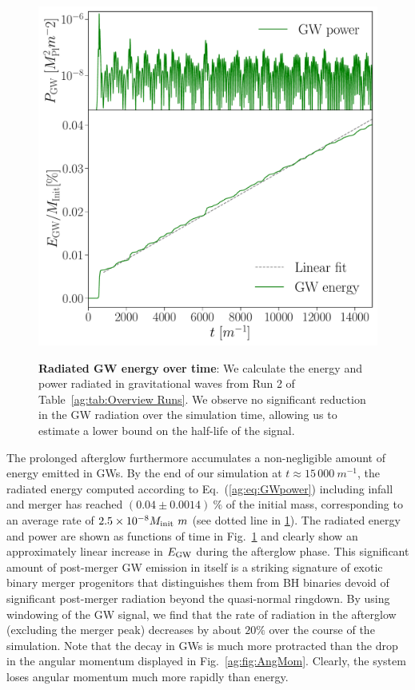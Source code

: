 \begin{figure}[h!]
\begin{center}
{\includegraphics[width=0.6\columnwidth]{ag_fig/Energy_Power.pdf}}
\caption{{\bf Radiated GW energy over time}: We calculate the energy and power radiated in gravitational waves from Run 2 of Table~\ref{ag:tab:Overview Runs}.
We observe no significant reduction in the GW radiation over the simulation time, allowing us to estimate a lower bound on the half-life of the signal.
    }
\label{ag:fig:EnergyPower}
\end{center}
\end{figure}







The prolonged afterglow furthermore accumulates a non-negligible
amount of energy emitted in GWs. By the end of our simulation
at $t\approx 15\,000~m^{-1}$, the radiated energy computed
according to Eq.~(\ref{ag:eq:GWpower}) including
infall and merger has reached
$(0.04 \pm 0.0014)~\% $ of the initial mass,
corresponding to an average rate of $2.5 \times 10^{-8} M_{\rm init}~m$ (see dotted line in \ref{ag:fig:EnergyPower}).
The radiated energy and power are shown
as functions of time in Fig.~\ref{ag:fig:EnergyPower}
and clearly show an approximately linear increase in
$E_{\rm GW}$ during the afterglow phase.
This significant amount of post-merger GW emission in itself is a
striking signature of exotic binary merger progenitors
that distinguishes them from BH binaries devoid
of significant post-merger radiation beyond the quasi-normal ringdown.
By using windowing of the GW signal, we find that the rate of radiation in the afterglow (excluding the merger peak) decreases by about $20 \%$ over the course of the simulation.
Note that the decay in GWs is much more protracted than the drop in the angular momentum displayed in Fig.~\ref{ag:fig:AngMom}.
Clearly, the system loses angular momentum much more rapidly
than energy.


